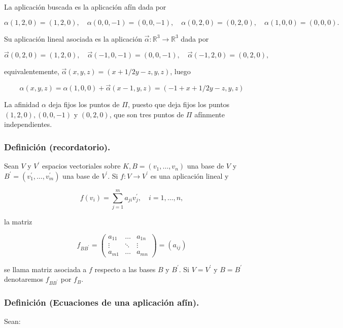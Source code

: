 \documentclass[12pt, a4paper, ones, notitlepage, openany,titlepage]{article}
\begin{document}
La aplicación buscada es la aplicación afín dada por

$$
\alpha(1,2,0)=(1,2,0), \quad \alpha(0,0,-1)=(0,0,-1), \quad \alpha(0,2,0)=(0,2,0), \quad \alpha(1,0,0)=(0,0,0) .
$$

Su aplicación lineal asociada es la aplicación $\vec{\alpha}: \mathbb{R}^{3} \rightarrow \mathbb{R}^{3}$ dada por

$$
\vec{\alpha}(0,2,0)=(1,2,0), \quad \vec{\alpha}(-1,0,-1)=(0,0,-1), \quad \vec{\alpha}(-1,2,0)=(0,2,0),
$$

equivalentemente, $\vec{\alpha}(x, y, z)=(x+1 / 2 y-z, y, z)$, luego

$$
\alpha(x, y, z)=\alpha(1,0,0)+\vec{\alpha}(x-1, y, z)=(-1+x+1 / 2 y-z, y, z)
$$

La afinidad $\alpha$ deja fijos los puntos de $\Pi$, puesto que deja fijos los puntos $(1,2,0),(0,0,-1)$ y $(0,2,0)$, que son tres puntos de $\Pi$ afínmente independientes.

\subsubsection{Definición (recordatorio).} Sean $V$ y $V^{\prime}$ espacios vectoriales sobre $K, B=\left(v_{1}, \ldots, v_{n}\right)$ una base de $V$ y $B^{\prime}=\left(v_{1}^{\prime}, \ldots, v_{m}^{\prime}\right)$ una base de $V^{\prime}$. Si $f: V \rightarrow V^{\prime}$ es una aplicación lineal y

$$
f\left(v_{i}\right)=\sum_{j=1}^{m} a_{j i} v_{j}^{\prime}, \quad i=1, \ldots, n,
$$

la matriz

$$
f_{B B^{\prime}}=\left(\begin{array}{rrr}
a_{11} & \ldots & a_{1 n} \\
\vdots & \ddots & \vdots \\
a_{m 1} & \ldots & a_{m n}
\end{array}\right)=\left(a_{i j}\right)
$$

se llama matriz asociada a $f$ respecto a las bases $B$ y $B^{\prime}$. Si $V=V^{\prime}$ y $B=B^{\prime}$ denotaremos $f_{B B^{\prime}}$ por $f_{B}$.

\subsubsection{Definición (Ecuaciones de una aplicación afín).} Sean:
\end{document}
